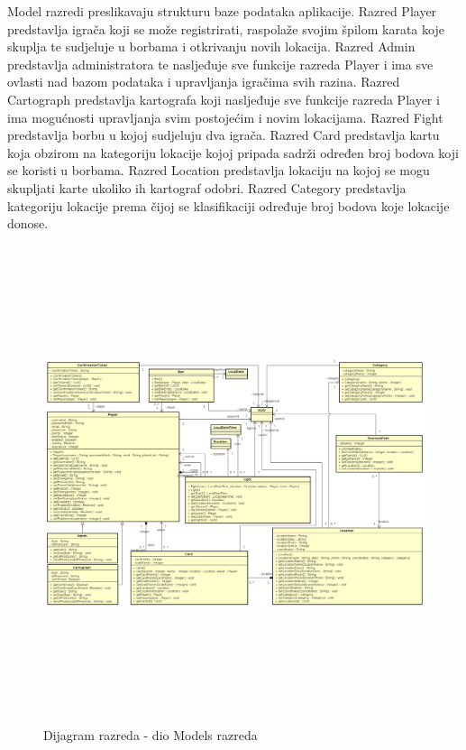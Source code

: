 			{Model razredi preslikavaju strukturu baze podataka aplikacije. Razred Player predstavlja igrača koji se može registrirati, raspolaže svojim špilom karata koje skuplja te sudjeluje u borbama i otkrivanju novih lokacija. Razred Admin predstavlja administratora te nasljeđuje sve funkcije razreda Player i ima sve ovlasti nad bazom podataka i upravljanja igračima svih razina. Razred Cartograph predstavlja kartografa koji nasljeđuje sve funkcije razreda Player i ima mogućnosti upravljanja svim postojećim i novim lokacijama. Razred Fight predstavlja borbu u kojoj sudjeluju dva igrača. Razred Card predstavlja kartu koja obzirom na kategoriju lokacije kojoj pripada sadrži određen broj bodova koji se koristi u borbama. Razred Location predstavlja lokaciju na kojoj se mogu skupljati karte ukoliko ih kartograf odobri. Razred Category predstavlja kategoriju lokacije prema čijoj se klasifikaciji određuje broj bodova koje lokacije donose.}
			
			\begin{figure}[H]
				\includegraphics[width=\linewidth, height=14cm]{dijagrami/modelclass_diagram}				
				\centering
				\caption{Dijagram razreda - dio Models razreda}
				\label{}
			\end{figure}
			
%			
			
